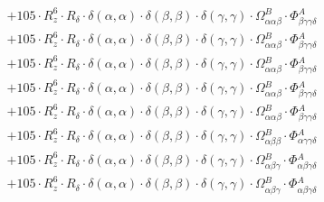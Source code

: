 \documentclass{article}
\begin{document}
\begin{subequations}
\begin{gather}
\begin{array}{c}
 \\[0.2em] 		 + 105 \cdot R_{z}^{6} \cdot R_{\delta{}} \cdot \delta{}\left(\alpha{}, \alpha{}\right) \cdot \delta{}\left(\beta{}, \beta{}\right) \cdot \delta{}\left(\gamma{}, \gamma{}\right) \cdot \Omega{}^{B}_{\alpha{}\alpha{}\beta{}} \cdot \Phi{}^{A}_{\beta{}\gamma{}\gamma{}\delta{}} 
 \\[0.2em] 		 + 105 \cdot R_{z}^{6} \cdot R_{\delta{}} \cdot \delta{}\left(\alpha{}, \alpha{}\right) \cdot \delta{}\left(\beta{}, \beta{}\right) \cdot \delta{}\left(\gamma{}, \gamma{}\right) \cdot \Omega{}^{B}_{\alpha{}\alpha{}\beta{}} \cdot \Phi{}^{A}_{\beta{}\gamma{}\gamma{}\delta{}} 
 \\[0.2em] 		 + 105 \cdot R_{z}^{6} \cdot R_{\delta{}} \cdot \delta{}\left(\alpha{}, \alpha{}\right) \cdot \delta{}\left(\beta{}, \beta{}\right) \cdot \delta{}\left(\gamma{}, \gamma{}\right) \cdot \Omega{}^{B}_{\alpha{}\alpha{}\beta{}} \cdot \Phi{}^{A}_{\beta{}\gamma{}\gamma{}\delta{}} 
 \\[0.2em] 		 + 105 \cdot R_{z}^{6} \cdot R_{\delta{}} \cdot \delta{}\left(\alpha{}, \alpha{}\right) \cdot \delta{}\left(\beta{}, \beta{}\right) \cdot \delta{}\left(\gamma{}, \gamma{}\right) \cdot \Omega{}^{B}_{\alpha{}\alpha{}\beta{}} \cdot \Phi{}^{A}_{\beta{}\gamma{}\gamma{}\delta{}} 
 \\[0.2em] 		 + 105 \cdot R_{z}^{6} \cdot R_{\delta{}} \cdot \delta{}\left(\alpha{}, \alpha{}\right) \cdot \delta{}\left(\beta{}, \beta{}\right) \cdot \delta{}\left(\gamma{}, \gamma{}\right) \cdot \Omega{}^{B}_{\alpha{}\alpha{}\beta{}} \cdot \Phi{}^{A}_{\beta{}\gamma{}\gamma{}\delta{}} 
 \\[0.2em] 		 + 105 \cdot R_{z}^{6} \cdot R_{\delta{}} \cdot \delta{}\left(\alpha{}, \alpha{}\right) \cdot \delta{}\left(\beta{}, \beta{}\right) \cdot \delta{}\left(\gamma{}, \gamma{}\right) \cdot \Omega{}^{B}_{\alpha{}\beta{}\beta{}} \cdot \Phi{}^{A}_{\alpha{}\gamma{}\gamma{}\delta{}} 
 \\[0.2em] 		 + 105 \cdot R_{z}^{6} \cdot R_{\delta{}} \cdot \delta{}\left(\alpha{}, \alpha{}\right) \cdot \delta{}\left(\beta{}, \beta{}\right) \cdot \delta{}\left(\gamma{}, \gamma{}\right) \cdot \Omega{}^{B}_{\alpha{}\beta{}\gamma{}} \cdot \Phi{}^{A}_{\alpha{}\beta{}\gamma{}\delta{}} 
 \\[0.2em] 		 + 105 \cdot R_{z}^{6} \cdot R_{\delta{}} \cdot \delta{}\left(\alpha{}, \alpha{}\right) \cdot \delta{}\left(\beta{}, \beta{}\right) \cdot \delta{}\left(\gamma{}, \gamma{}\right) \cdot \Omega{}^{B}_{\alpha{}\beta{}\gamma{}} \cdot \Phi{}^{A}_{\alpha{}\beta{}\gamma{}\delta{}} 

\end{array}
\end{gather}
\end{subequations}
\end{document}

